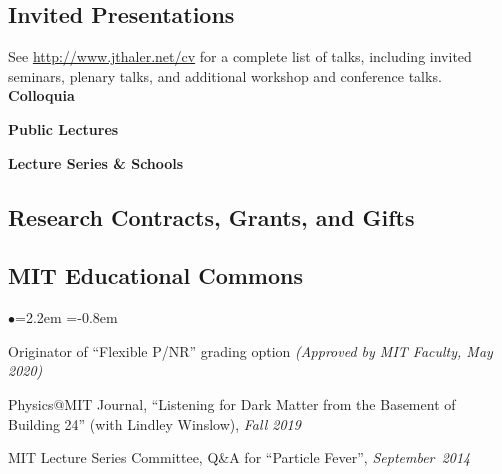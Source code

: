 \documentclass[11pt]{article}
\newcommand{\heading}[1]{\vspace{0in}\subsection*{#1} \vspace{.02in}}
\newcommand{\bbl}{\begin{list}{$\bullet$}{\leftmargin=2.2em \itemsep=-1pt \itemindent=-0.8em}}
\newcommand{\el}{\end{list}}
\begin{document}
\vspace{-.1in}
 


\newpage


\heading{Invited Presentations}

See \url{http://www.jthaler.net/cv} for a complete list of talks, including invited seminars, plenary talks, and additional workshop and conference talks.\\

\noindent \textbf{Colloquia}




\noindent \textbf{Public Lectures}




\noindent \textbf{Lecture Series \& Schools}



  
\heading{Research Contracts, Grants, and Gifts}




\heading{MIT Educational Commons}

\bbl
\item Originator of ``Flexible P/NR'' grading option \textit{(Approved by MIT Faculty, May 2020)}

\item Physics@MIT Journal, ``Listening for Dark Matter from the Basement of Building 24'' (with Lindley Winslow), \textit{Fall 2019}
\item MIT Lecture Series Committee, Q\&A for ``Particle Fever'', \textit{September~2014}
\el
\end{document}
